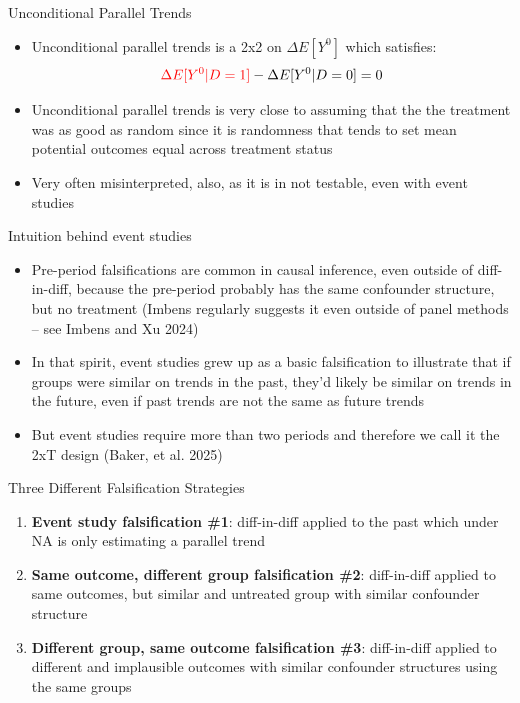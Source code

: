 \documentclass{beamer}
\begin{document}
\begin{frame}{Unconditional Parallel Trends}

\begin{itemize}
\item Unconditional parallel trends is a 2x2 on $\Delta E[Y^0]$ which satisfies:
	$$\textcolor{red}{\Delta E[Y^0|D=1]} - \Delta E[Y^0|D=0] = 0$$
\item Unconditional parallel trends is very close to assuming that the the treatment was as good as random since it is randomness that tends to set mean potential outcomes equal across treatment status
\item Very often misinterpreted, also, as it is in not testable, even with event studies
\end{itemize}


\end{frame}

\begin{frame}{Intuition behind event studies}

\begin{itemize}

	\item Pre-period falsifications are common in causal inference, even outside of diff-in-diff, because the pre-period probably has the same confounder structure, but no treatment (Imbens regularly suggests it even outside of panel methods -- see Imbens and Xu 2024)
	\item In that spirit, event studies grew up as a basic falsification to illustrate that if groups were similar on trends in the past, they'd likely be similar on trends in the future, even if past trends are not the same as future trends
	\item But event studies require more than two periods and therefore we call it the 2xT design (Baker, et al. 2025)


\end{itemize}

\end{frame}




\begin{frame}{Three Different Falsification Strategies}

	\begin{enumerate}
	\item \textbf{Event study falsification \#1}: diff-in-diff applied to the past which under NA is only estimating a parallel trend
	\item \textbf{Same outcome, different group falsification \#2}: diff-in-diff applied to same outcomes, but similar and untreated group with similar confounder structure
	\item \textbf{Different group, same outcome falsification \#3}: diff-in-diff applied to different and implausible outcomes with similar confounder structures using the same groups
	\end{enumerate}


\end{frame}
\end{document}
